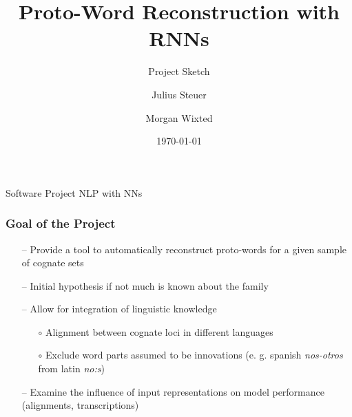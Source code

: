 \documentclass[11pt]{beamer}
\title{Proto-Word Reconstruction with RNNs}
\subtitle{Project Sketch}
\date{\today}
\author{Julius Steuer \and Morgan Wixted}
\begin{document}
\begin{frame}[plain]
    \small
    Software Project NLP with NNs
    \normalsize
    \titlepage
\end{frame}

\begin{frame}
    \frametitle{Goal of the Project}
    \begin{itemize}
        \item[--] Provide a tool to automatically reconstruct proto-words for a given sample of cognate sets
        \item[--] Initial hypothesis if not much is known about the family
        \item[--] Allow for integration of linguistic knowledge
        \begin{itemize}
            \item[$\circ$] Alignment between cognate loci in different languages
            \item[$\circ$] Exclude word parts assumed to be innovations (e. g. spanish \textit{nos-otros} from latin \textit{no:s}) 
        \end{itemize}
        \item[--] Examine the influence of input representations on model performance (alignments, transcriptions) 
    \end{itemize}
\end{frame}
\end{document}
